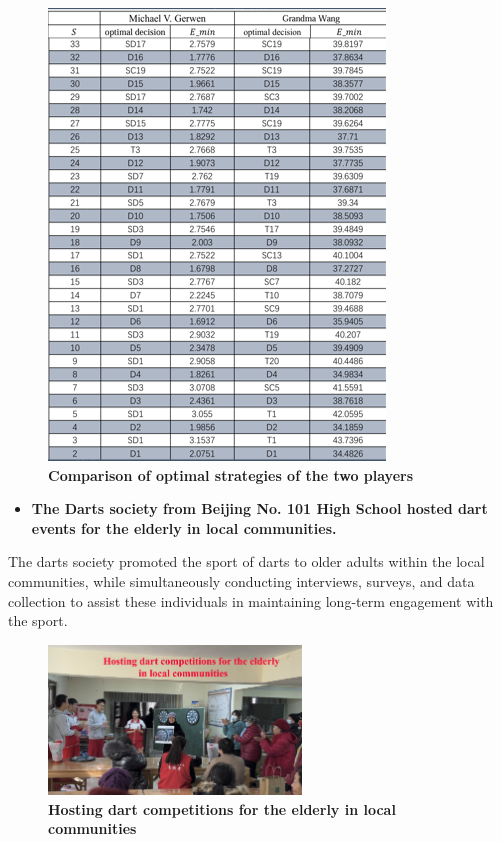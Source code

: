 \documentclass[cjjs]{ipart}
\theoremstyle{plain}
\begin{document}
\begin{figure}[H]
\begin{minipage}{0.45\textwidth}
        \includegraphics[width=\textwidth]{picture2.png} 
        \caption{\textbf{Comparison of optimal strategies of the two players}}  
        \label{fig:image2}
    \end{minipage}
\end{figure}

\newpage
\begin{itemize}
    \item \textbf{The Darts society from Beijing No. 101 High School hosted dart events for the elderly in local communities.}
\end{itemize}

\text The darts society promoted the sport of darts to older adults within the local communities, while simultaneously conducting interviews, surveys, and data collection to assist these individuals in maintaining long-term engagement with the sport.
\begin{figure}[H]
    \centering
    \includegraphics[width=0.60\textwidth]{14.jpg} 
    \caption{\textbf{Hosting dart competitions for the elderly in local communities}}
    \label{fig:dartboard}
\end{figure}
\end{document}
